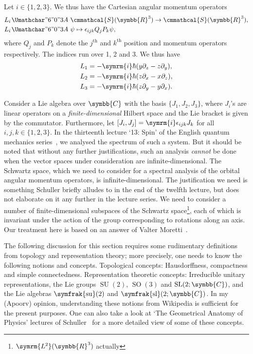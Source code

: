 \documentclass[12pt, a4 paper]{article}
\renewcommand{\symcal}{\cmmathcal}
\theoremstyle{definition}
\newcommand{\ltwo}{\symrm{L\kern-0.3pt^2}}
\newcommand{\ltworthree}{\ltwo(\rr^3)}
\newcommand{\position}{Q}
\newcommand{\momentum}{P}
\newcommand{\rr}{\symbb{R}}
\newcommand{\cc}{\symbb{C}}
\newcommand{\schwartz}{\symcal{S}}
\newcommand{\schwartzrthree}{\schwartz(\rr^3)}
\renewcommand{\i}{\symrm{i}}
\newcommand{\levi}{\epsilon_{ijk}}
\newcommand{\sutwo}{\operatorname{\symfrak{su}}(2)}
\newcommand{\sltwoc}{\operatorname{\symfrak{sl}}(2;\cc)}
\newcommand{\SUtwo}{\operatorname{SU}(2)}
\newcommand{\SOthree}{\operatorname{SO}(3)}
\renewcommand{\colon}{\nobreak\mskip2mu\mathpunct{}\nonscript
  \mkern-\thinmuskip{\Umathchar"6 "0 "3A}\mskip6muplus1mu\relax}
\begin{document}
    Let $i \in \{1,2,3\}$. We thus have the Cartesian angular momentum operators
    \begin{align*}
        L_i &\colon \schwartzrthree \rightarrow \schwartzrthree,\\
        L_i &\colon \psi \mapsto \levi\position_j\momentum_k\psi,
    \end{align*}
    where $\position_j$ and $\momentum_k$ denote the $j^\text{th}$ and $k^\text{th}$ position and momentum operators respectively. The indices run over 1, 2 and 3.
    We thus have
    \begin{align*}
        L_1 &= -\i\hbar(y\partial_z - z\partial_y),\\
        L_2 &= -\i\hbar(z\partial_x - x\partial_z),\\
        L_3 &= -\i\hbar(z\partial_y - y\partial_x).
    \end{align*}

    Consider a Lie algebra over \(\cc\) with the basis \(\{J_1, J_2, J_3\}\), where \(J_i\)'s are linear operators on a \textit{finite-dimensional} Hilbert space and the Lie bracket is given by the commutator. Furthermore, let \([J_i, J_j] = \i \epsilon_{ijk} J_k\) for all \(i, j, k \in \{1, 2, 3\}\). In the thirteenth lecture `13: Spin' of the English quantum mechanics series~\cite{Schuller, SchullerVideos}, we analysed the spectrum of such a system. But it should be noted that without any further justifications, such an analysis \textit{cannot} be done when the vector spaces under consideration are infinite-dimensional. The Schwartz space, which we need to consider for a spectral analysis of the orbital angular momentum operators, is infinite-dimensional. The justification we need is something Schuller briefly alludes to in the end of the twelfth lecture, but does not elaborate on it any further in the lecture series. We need to consider a number of finite-dimensional subspaces of the Schwartz space\footnote{\(\ltworthree\) actually}, each of which is invariant under the action of the group corresponding to rotations along an axis. Our treatment here is based on an answer of Valter Moretti~\cite{MorettiPeter}.

    The following discussion for this section requires some rudimentary definitions from topology and representation theory; more precisely, one needs to know the following notions and concepts. Topological concepts: Hausdorffness, compactness and simple connectedness. Representation theoretic concepts: Irreducible unitary representations, the Lie groups \(\SUtwo\), \(\SOthree\) and \(\operatorname{SL}(2;\cc)\), and the Lie algebras \(\sutwo\) and \(\sltwoc\). In my (Apoorv) opinion, understanding these notions from Wikipedia is sufficient for the present purposes. One can also take a look at `The Geometrical Anatomy of Physics' lectures of Schuller~\cite{Schuller_geometric_videos, Schuller_geometric_notes} for a more detailed view of some of these concepts.
\end{document}
